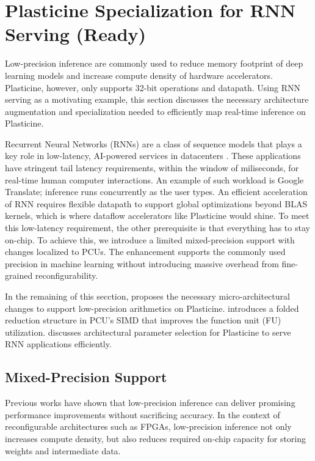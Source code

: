 \section{Plasticine Specialization for RNN Serving (Ready)} \label{sec:rnn_arch}

Low-precision inference are commonly used to reduce memory footprint of deep learning models and
increase compute density of hardware accelerators.
Plasticine, however, only supports 32-bit operations and datapath.
Using RNN serving as a motivating example, this section discusses the necessary architecture augmentation and
specialization needed to efficiently map real-time inference on Plasticine.

Recurrent Neural Networks (RNNs) are a class of sequence models that plays a key role
in low-latency, AI-powered services in datacenters \cite{fowers2018configurable, jouppi2017datacenter}.
These applications have stringent tail latency requirements, within the window of miliseconds,
for real-time human computer interactions.
An example of such workload is
Google Translate; inference runs concurrently as the user types.
An efficient acceleration of RNN requires flexible datapath to support global optimizations beyond
BLAS kernels, which is where dataflow accelerators like Plasticine would shine.
To meet this low-latency requirement, the other prerequisite is that everything has to stay on-chip.
To achieve this, we introduce a limited mixed-precision support with changes localized to PCUs. 
The enhancement supports the commonly used precision in machine learning without introducing massive
overhead from fine-grained reconfigurability.

In the remaining of this secction,  proposes the necessary micro-architectural changes to
  support low-precision arithmetics on Plasticine.
 introduces a folded reduction structure in PCU's SIMD that improves the function
unit (FU) utilization.
 discusses architectural parameter selection for Plasticine
  to serve RNN applications efficiently.

\subsection{Mixed-Precision Support} \label{sec:lowprec}
\label{sec:arch:varprec}
Previous works \cite{fowers2018configurable, jouppi2017datacenter}
  have shown that low-precision inference can deliver promising performance
  improvements without sacrificing accuracy.
In the context of reconfigurable architectures such as FPGAs,
  low-precision inference not only increases compute density,
  but also reduces required on-chip capacity for
  storing weights and intermediate data.

